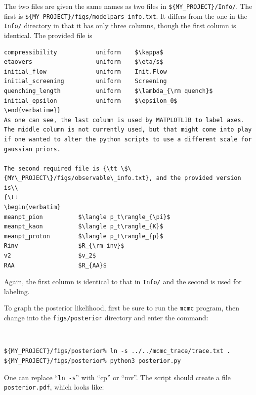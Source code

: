 \documentclass[UserManual.tex]{subfiles}
\begin{document}
The two files are given the same names as two files in {\tt \$\{MY\_PROJECT\}/Info/}. The first is {\tt \$\{MY\_PROJECT\}/figs/modelpars\_info.txt}. It differs from the one in the {\tt Info/} directory in that it has only three columns, though the first column is identical. The provided file is\\
{\tt\begin{verbatim}
compressibility           uniform    $\kappa$
etaovers                  uniform    $\eta/s$
initial_flow              uniform    Init.Flow
initial_screening         uniform    Screening
quenching_length          uniform    $\lambda_{\rm quench}$
initial_epsilon           uniform    $\epsilon_0$
\end{verbatime}}
As one can see, the last column is used by MATPLOTLIB to label axes. The middle column is not currently used, but that might come into play if one wanted to alter the python scripts to use a different scale for gaussian priors.

The second required file is {\tt \$\{MY\_PROJECT\}/figs/observable\_info.txt}, and the provided version is\\
{\tt
\begin{verbatim}
meanpt_pion          $\langle p_t\rangle_{\pi}$
meanpt_kaon          $\langle p_t\rangle_{K}$
meanpt_proton        $\langle p_t\rangle_{p}$
Rinv                 $R_{\rm inv}$
v2                   $v_2$
RAA                  $R_{AA}$
\end{verbatim}}
Again, the first column is identical to that in {\tt Info/} and the second is used for labeling.

To graph the posterior likelihood, first be sure to run the {\tt mcmc} program, then change into the {\tt figs/posterior} directory and enter the command:
{\tt
\begin{verbatim}
${MY_PROJECT}/figs/posterior% ln -s ../../mcmc_trace/trace.txt .
${MY_PROJECT}/figs/posterior% python3 posterior.py
\end{verbatim}}
One can replace ``{\tt ln -s}'' with ``cp'' or ``mv''. The script should create a file {\tt posterior.pdf}, which looks like:
\end{document}

